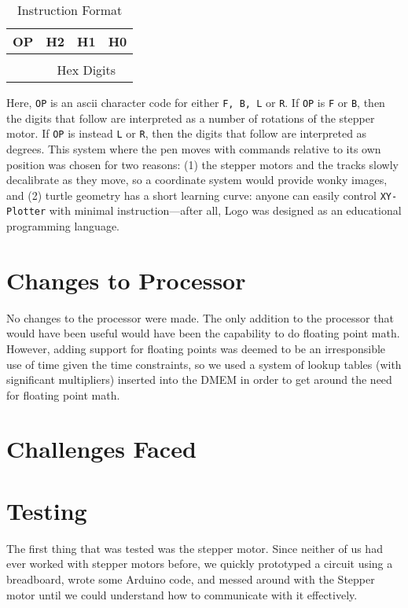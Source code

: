 \documentclass[12pt]{article}
\begin{document}
\begin{table}[ht!]
\centering
\begin{tabular}{|c|c|c|c|} \hline
OP & H2 & H1 & H0 \\ \hline
\multicolumn{1}{c}{} & \multicolumn{3}{p{2cm}}{\raisebox{.5\baselineskip}{$\underbrace{\hspace{2.45cm}}$}} \\
\multicolumn{1}{c}{} & \multicolumn{3}{c}{Hex Digits} \\
\end{tabular}
\caption{Instruction Format}
\end{table}

Here, {\tt OP} is an ascii character code for either {\tt F, B, L} or {\tt R}. If {\tt OP} is {\tt F} or {\tt B}, then the digits that follow are interpreted as a number of rotations of the stepper motor. If {\tt OP} is instead {\tt L} or {\tt R}, then the digits that follow are interpreted as degrees. This system where the pen moves with commands relative to its own position was chosen for two reasons: (1) the stepper motors and the tracks slowly decalibrate as they move, so a coordinate system would provide wonky images, and (2) turtle geometry has a short learning curve: anyone can easily control {\tt XY-Plotter} with minimal instruction---after all, Logo was designed as an educational programming language.

\section{Changes to Processor}
No changes to the processor were made. The only addition to the processor that would have been useful would have been the capability to do floating point math. However, adding support for floating points was deemed to be an irresponsible use of time given the time constraints, so we used a system of lookup tables (with significant multipliers) inserted into the DMEM in order to get around the need for floating point math.

\section{Challenges Faced}



\section{Testing}
The first thing that was tested was the stepper motor. Since neither of us had ever worked with stepper motors before, we quickly prototyped a circuit using a breadboard, wrote some Arduino code, and messed around with the Stepper motor until we could understand how to communicate with it effectively. 
\end{document}
